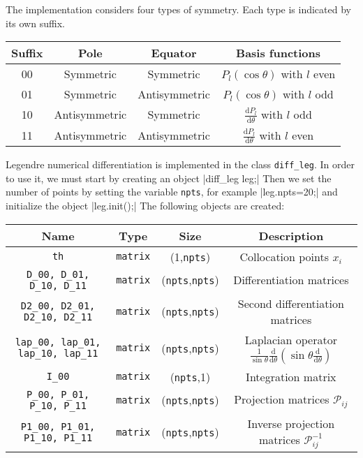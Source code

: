 The implementation considers four types of symmetry. Each type is indicated by its own suffix.

\medskip

\begin{tabular}{cccc}
Suffix& Pole &Equator&Basis functions\\
\hline
00&Symmetric&Symmetric&$P_l(\cos\theta)$ with $l$ even \\
01&Symmetric&Antisymmetric&$P_l(\cos\theta)$ with $l$ odd\\
10&Antisymmetric&Symmetric&$\frac{\mathrm{d}P_l}{\mathrm{d}\theta}$ with $l$ odd\\
11&Antisymmetric&Antisymmetric&$\frac{\mathrm{d}P_l}{\mathrm{d}\theta}$ with $l$ even\\
\end{tabular}

\medskip

Legendre numerical differentiation is implemented in the class \texttt{diff\_leg}. In order to use
it, we must start by creating an object
|diff_leg leg;|
Then we set the number of points by setting the variable \texttt{npts}, for example
|leg.npts=20;|
and initialize the object
|leg.init();|
The following objects are created:

\medskip
\begin{tabular}{cccc}
Name&Type&Size&Description\\
\hline
\texttt{th}&\texttt{matrix}&(1,\texttt{npts})& Collocation points $x_i$\\
\texttt{D\_00, D\_01, D\_10, D\_11}&\texttt{matrix}&
(\texttt{npts},\texttt{npts})&Differentiation matrices\\
\texttt{D2\_00, D2\_01, D2\_10, D2\_11}&\texttt{matrix}&
(\texttt{npts},\texttt{npts})&Second differentiation matrices\\
\texttt{lap\_00, lap\_01, lap\_10, lap\_11}&\texttt{matrix}&
(\texttt{npts},\texttt{npts})&Laplacian operator
$\frac{1}{\sin\theta}\frac{\mathrm{d}}{\mathrm{d}\theta}\left(\sin\theta\frac{\mathrm{d}}{\mathrm{d}\theta}\right)$\\
\texttt{I\_00}&\texttt{matrix}&(\texttt{npts},1)&Integration matrix\\
\texttt{P\_00, P\_01, P\_10, P\_11}&\texttt{matrix}&
(\texttt{npts},\texttt{npts})&Projection matrices $\mathcal{P}_{ij}$\\
\texttt{P1\_00, P1\_01, P1\_10, P1\_11}&\texttt{matrix}&
(\texttt{npts},\texttt{npts})&Inverse projection matrices $\mathcal{P}^{-1}_{ij}$\\
\end{tabular}
\medskip

